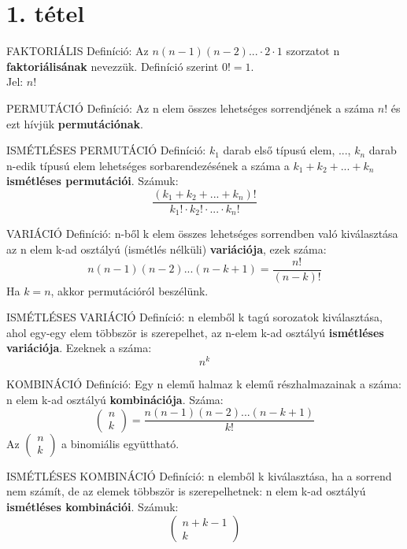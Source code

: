 \section{1. tétel}

\begin{shaded}
FAKTORIÁLIS Definíció: Az $n(n-1)(n-2)...\cdot2\cdot1$ szorzatot n \textbf{faktoriálisának} nevezzük. Definíció szerint $0! = 1$.\\
Jel: $n!$
\end{shaded}
\begin{shaded}
PERMUTÁCIÓ Definíció: Az n elem összes lehetséges sorrendjének a száma $n!$ és ezt hívjük \textbf{permutációnak}.
\end{shaded}
\begin{shaded}
ISMÉTLÉSES PERMUTÁCIÓ Definíció: $k_1$ darab első típusú elem, ..., $k_n$ darab n-edik típusú elem lehetséges sorbarendezésének a száma a $k_1 + k_2 + ... + k_n$ \textbf{ismétléses permutációi}. Számuk:
$$\frac{(k_1+k_2+...+k_n)!}{k_1!\cdot k_2!\cdot...\cdot k_n!}$$
\end{shaded}
\begin{shaded}
VARIÁCIÓ Definíció: n-ből k elem összes lehetséges sorrendben való kiválasztása az n elem k-ad osztályú (ismétlés nélküli) \textbf{variációja}, ezek száma:
$$n(n-1)(n-2)...(n-k+1) = \frac{n!}{(n-k)!}$$
Ha $k=n$, akkor permutációról beszélünk.
\end{shaded}
\begin{shaded}
ISMÉTLÉSES VARIÁCIÓ Definíció: n elemből k tagú sorozatok kiválasztása, ahol egy-egy elem többször is szerepelhet, az n-elem k-ad osztályú \textbf{ismétléses variációja}. Ezeknek a száma:
$$n^k$$
\end{shaded}
\begin{shaded}
KOMBINÁCIÓ Definíció: Egy n elemű halmaz k elemű részhalmazainak a száma: n elem k-ad osztályú \textbf{kombinációja}. Száma:
$$\begin{pmatrix}
n\\k
\end{pmatrix} = \frac{n(n-1)(n-2)...(n-k+1)}{k!}$$
Az $\begin{pmatrix}
n\\k
\end{pmatrix}$ a binomiális együttható.
\end{shaded}
\begin{shaded}
ISMÉTLÉSES KOMBINÁCIÓ Definíció: n elemből k kiválasztása, ha a sorrend nem számít, de az elemek többször is szerepelhetnek: n elem k-ad osztályú \textbf{ismétléses kombinációi}. Számuk: $$\begin{pmatrix}
n+k-1\\k
\end{pmatrix}$$
\end{shaded}
